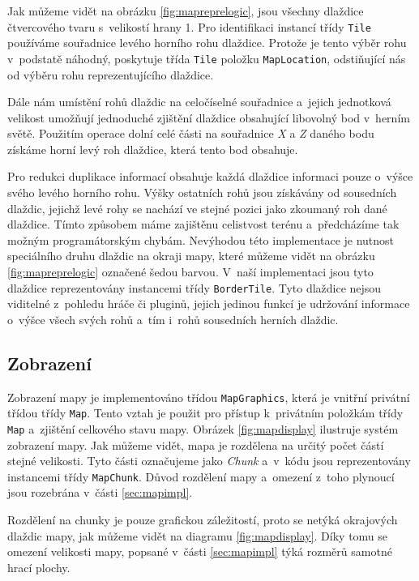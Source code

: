 Jak můžeme vidět na obrázku \ref{fig:mapreprelogic}, jsou všechny dlaždice čtvercového tvaru s~velikostí hrany 1. Pro identifikaci instancí třídy \texttt{Tile} používáme souřadnice levého horního rohu dlaždice. Protože je tento výběr rohu v~podstatě náhodný, poskytuje třída \texttt{Tile} položku \texttt{MapLocation}, odstiňující nás od výběru rohu reprezentujícího dlaždice.

Dále nám umístění rohů dlaždic na celočíselné souřadnice a~jejich jednotková velikost umožňují jednoduché zjištění dlaždice obsahující libovolný bod v~herním světě. Použitím operace dolní celé části na souřadnice \textit{X} a \textit{Z} daného bodu získáme horní levý roh dlaždice, která tento bod obsahuje.

Pro redukci duplikace informací obsahuje každá dlaždice informaci pouze o~výšce svého levého horního rohu. Výšky ostatních rohů jsou získávány od sousedních dlaždic, jejichž levé rohy se nachází ve stejné pozici jako zkoumaný roh dané dlaždice. Tímto způsobem máme zajištěnu celistvost terénu a~předcházíme tak možným programátorským chybám. Nevýhodou této implementace je nutnost speciálního druhu dlaždic na okraji mapy, které můžeme vidět na obrázku \ref{fig:mapreprelogic} označené šedou barvou. V~naší implementaci jsou tyto dlaždice reprezentovány instancemi třídy \texttt{BorderTile}. Tyto dlaždice nejsou viditelné z~pohledu hráče či pluginů, jejich jedinou funkcí je udržování informace o~výšce všech svých rohů a~tím i~rohů sousedních herních dlaždic. 


\subsection{Zobrazení}
Zobrazení mapy je implementováno třídou \texttt{MapGraphics}, která je vnitřní privátní třídou třídy \texttt{Map}. Tento vztah je použit pro přístup k~privátním položkám třídy \texttt{Map} a~zjištění celkového stavu mapy. Obrázek \ref{fig:mapdisplay} ilustruje systém zobrazení mapy. Jak můžeme vidět, mapa je rozdělena na určitý počet částí stejné velikosti. Tyto části označujeme jako \textit{Chunk} a~v~kódu jsou reprezentovány instancemi třídy \texttt{MapChunk}. Důvod rozdělení mapy a~omezení z~toho plynoucí jsou rozebrána v~části \ref{sec:mapimpl}. 

Rozdělení na chunky je pouze grafickou záležitostí, proto se netýká okrajových dlaždic mapy, jak můžeme vidět na diagramu \ref{fig:mapdisplay}. Díky tomu se omezení velikosti mapy, popsané v~části \ref{sec:mapimpl} týká rozměrů samotné hrací plochy.

